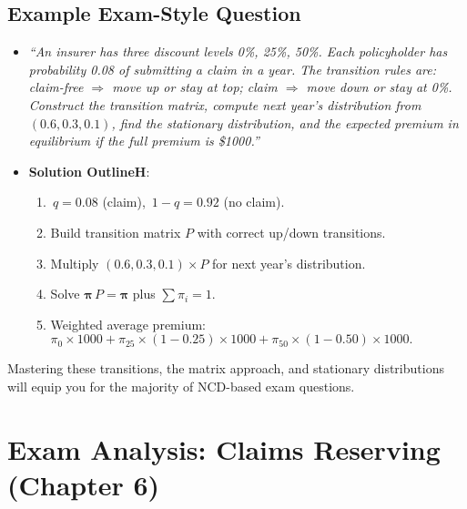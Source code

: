 \documentclass[13pt,a4paper]{article}
\begin{document}
\subsection{Example Exam-Style Question}
\begin{itemize}
  \item \emph{“An insurer has three discount levels 0\%, 25\%, 50\%. Each policyholder has probability 0.08 of submitting a claim in a year. The transition rules are: claim-free \(\Rightarrow\) move up or stay at top; claim \(\Rightarrow\) move down or stay at 0\%. Construct the transition matrix, compute next year’s distribution from \((0.6,0.3,0.1)\), find the stationary distribution, and the expected premium in equilibrium if the full premium is \$1000.”}
  \item \textbf{Solution OutlineH}:
    \begin{enumerate}
      \item \(\,q=0.08\) (claim), \(\,1-q=0.92\) (no claim).  
      \item Build transition matrix \(P\) with correct up/down transitions.  
      \item Multiply \((0.6,0.3,0.1)\times P\) for next year’s distribution.  
      \item Solve \(\boldsymbol{\pi}\,P=\boldsymbol{\pi}\) plus \(\sum \pi_i=1\).  
      \item Weighted average premium: 
        \(\pi_0\times 1000 + \pi_{25}\times (1-0.25)\times 1000 + \pi_{50}\times (1-0.50)\times 1000.\)
    \end{enumerate}
\end{itemize}

\noindent
Mastering these transitions, the matrix approach, and stationary distributions will equip you for the majority of NCD-based exam questions.

\section{Exam Analysis: Claims Reserving (Chapter 6)}
\label{sec:reserving_exam_analysis}
\end{document}
